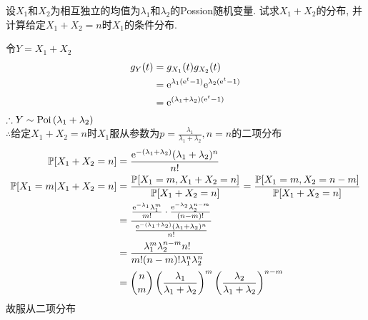 \begin{problem}{1.14}
设$X_1$和$X_2$为相互独立的均值为${\lambda}_1$和${\lambda}_2$的Possion随机变量. 试求$X_1+X_2$的分布, 并计算给定$X_1+X_2 = n$时$X_1$的条件分布.
\end{problem}
\begin{solution}
	令$Y = X_1+X_2$
	\[\begin{aligned}
			g_Y(t) & = g_{X_1}(t)g_{X_2}(t)                             \\
			       & = \mathrm{e}^{{\lambda}_1(\mathrm{e}^t-1)}\mathrm{e}^{{\lambda}_2(\mathrm{e}^t-1)} \\
			       & = \mathrm{e}^{({\lambda}_1 + {\lambda}_2)(\mathrm{e}^t-1)}
		\end{aligned}\]
	$\therefore Y \sim \text{Poi}\,({\lambda}_1+{\lambda}_2)$\\
	$\therefore $给定$X_1+X_2 = n$时$X_1$服从参数为$p = \frac{{\lambda}_1}{{\lambda}_1 + {\lambda}_2}, n = n$的二项分布
	\[\begin{aligned}
			\mathbb{P}[X_1+X_2=n]       & = \frac{\mathrm{e}^{-(\lambda_1+\lambda_2)}(\lambda_1+\lambda_2)^n}{n!}                                                                                                  \\
			\mathbb{P}[X_1=m|X_1+X_2=n] & = \frac{\mathbb{P}[X_1=m,X_1+X_2=n]}{\mathbb{P}[X_1+X_2=n]}=\frac{\mathbb{P}[X_1=m,X_2=n-m]}{\mathbb{P}[X_1+X_2=n]}                                                                              \\
			                    & = \frac{\frac{\mathrm{e}^{-\lambda_1}\lambda_1^m}{m!}\cdot \frac{\mathrm{e}^{-\lambda_2}\lambda_2^{n-m}}{(n-m)!}}{\frac{\mathrm{e}^{-(\lambda_1+\lambda_2)}(\lambda_1+\lambda_2)^n}{n!}} \\
			                    & = \frac{\lambda_1 ^m \lambda_2 ^{n-m}n!}{m!(n-m)! \lambda_1 ^n \lambda_2 ^n}                                                                                     \\
			                    & = \binom{n}{m}\left(\frac{\lambda_1}{\lambda_1+\lambda_2}\right)^m \left(\frac{\lambda_2}{\lambda_1+\lambda_2}\right)^{n-m}
		\end{aligned}\]
	故服从二项分布
\end{solution}

